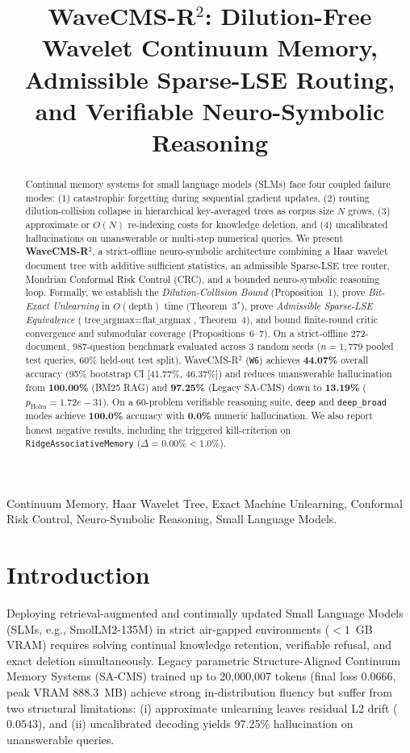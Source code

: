 \documentclass[conference]{IEEEtran}
\title{WaveCMS-R$^2$: Dilution-Free Wavelet Continuum Memory, Admissible Sparse-LSE Routing, and Verifiable Neuro-Symbolic Reasoning}
\author{\IEEEauthorblockN{Sovereign Brain Research Group}
\IEEEauthorblockA{Department of Computer Science \& Artificial Intelligence \\
Strict-Offline Air-Gapped NCKH Benchmark Suite \\
Email: research@sovereignbrain.local}}
\begin{document}
\maketitle

\begin{abstract}
Continual memory systems for small language models (SLMs) face four coupled failure modes: (1) catastrophic forgetting during sequential gradient updates, (2) routing dilution-collision collapse in hierarchical key-averaged trees as corpus size $N$ grows, (3) approximate or $O(N)$ re-indexing costs for knowledge deletion, and (4) uncalibrated hallucinations on unanswerable or multi-step numerical queries. We present \textbf{WaveCMS-R$^2$}, a strict-offline neuro-symbolic architecture combining a Haar wavelet document tree with additive sufficient statistics, an admissible Sparse-LSE tree router, Mondrian Conformal Risk Control (CRC), and a bounded neuro-symbolic reasoning loop. Formally, we establish the \emph{Dilution-Collision Bound} (Proposition~1), prove \emph{Bit-Exact Unlearning} in $O(\text{depth})$ time (Theorem~3$^*$), prove \emph{Admissible Sparse-LSE Equivalence} ($\text{tree\_argmax} = \text{flat\_argmax}$, Theorem~4), and bound finite-round critic convergence and submodular coverage (Propositions~6--7). On a strict-offline 272-document, 987-question benchmark evaluated across 3 random seeds ($n=1{,}779$ pooled test queries, 60\% held-out test split), WaveCMS-R$^2$ (\texttt{W6}) achieves \textbf{44.07\%} overall accuracy (95\% bootstrap CI [41.77\%, 46.37\%]) and reduces unanswerable hallucination from \textbf{100.00\%} (BM25 RAG) and \textbf{97.25\%} (Legacy SA-CMS) down to \textbf{13.19\%} ($p_{\text{Holm}} = 1.72e-31$). On a 60-problem verifiable reasoning suite, \texttt{deep} and \texttt{deep\_broad} modes achieve \textbf{100.0\%} accuracy with \textbf{0.0\%} numeric hallucination. We also report honest negative results, including the triggered kill-criterion on \texttt{RidgeAssociativeMemory} ($\Delta = 0.00\% < 1.0\%$).
\end{abstract}

\begin{IEEEkeywords}
Continuum Memory, Haar Wavelet Tree, Exact Machine Unlearning, Conformal Risk Control, Neuro-Symbolic Reasoning, Small Language Models.
\end{IEEEkeywords}

\section{Introduction}
Deploying retrieval-augmented and continually updated Small Language Models (SLMs, e.g., SmolLM2-135M) in strict air-gapped environments ($<1$~GB VRAM) requires solving continual knowledge retention, verifiable refusal, and exact deletion simultaneously. Legacy parametric Structure-Aligned Continuum Memory Systems (SA-CMS) trained up to 20,000,007 tokens (final loss 0.0666, peak VRAM 888.3~MB) achieve strong in-distribution fluency but suffer from two structural limitations: (i) approximate unlearning leaves residual L2 drift ($0.0543$), and (ii) uncalibrated decoding yields 97.25\% hallucination on unanswerable queries.
\end{document}
